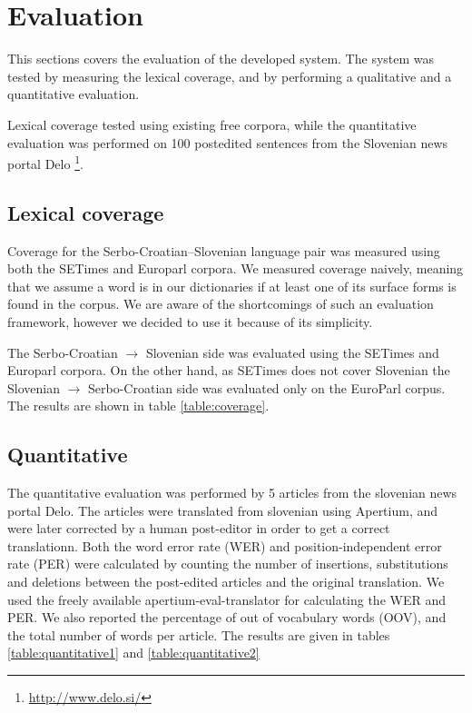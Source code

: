 \section{Evaluation}

This sections covers the evaluation of the developed system. 
The system was tested by measuring the lexical coverage, and by performing
a qualitative and a quantitative evaluation. 

Lexical coverage tested using existing free corpora, 
while the quantitative evaluation was performed on 100 postedited sentences from the Slovenian news portal 
Delo \footnote{\url{http://www.delo.si/}}.


\subsection{Lexical coverage}

Coverage for the Serbo-Croatian--Slovenian language pair was measured using both the SETimes \citep{tyers2010south} and Europarl \citep{koehn05a} corpora. 
We measured coverage naively, meaning that we assume a word is in our 
dictionaries if at least one of its surface forms is found in the corpus. 
We are aware of the shortcomings of such an evaluation framework, 
however we decided to use it because of its simplicity.

The Serbo-Croatian $\rightarrow$ Slovenian side was evaluated using the SETimes and Europarl corpora. On the other hand,
as SETimes does not cover Slovenian
the Slovenian $\rightarrow$ Serbo-Croatian side was evaluated only on the EuroParl corpus. The results are shown in table \ref{table:coverage}.

\subsection{Quantitative}

The quantitative evaluation was performed by 5 articles
from the slovenian news portal Delo.
The articles were translated from slovenian using Apertium, and were later corrected by a human post-editor in order to get a correct translationn.
Both the word error rate (WER) and position-independent error rate (PER) were calculated
by counting the number of insertions, substitutions and deletions between the post-edited articles
and the original translation. We used the freely available apertium-eval-translator for calculating the WER and PER.
We also reported the percentage of out of vocabulary words (OOV), and the total number of words per article.
The results are given in tables \ref{table:quantitative1} and \ref{table:quantitative2}

